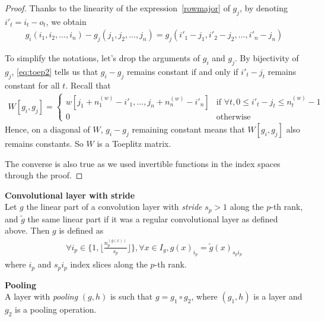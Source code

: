 \begin{proof}
Thanks to the linearity of the expression~\eqref{rowmajor} of $g_j$, by denoting $i'_t = i_t - o_t$, we obtain
\begin{gather}
  g_i(i_1, i_2, \ldots, i_n) - g_j(j_1, j_2, \ldots, j_n) = g_j(i'_1 - j_1, i'_2 - j_2, \ldots, i'_n - j_n)
\label{eq:toep2}
\end{gather}

To simplify the notations, let's drop the arguments of $g_i$ and $g_j$. By bijectivity of $g_j$, \eqref{eq:toep2} tells us that $g_i - g_j$ remains constant if and only if $i'_t - j_t$ remains constant for all $t$. Recall that 
\begin{gather}
  W[g_i,g_j] =
 \begin{cases}
   w[j_1 + n_1^{(w)} - i'_1, \ldots, j_n + n_n^{(w)} - i'_n] & \text{if } \forall t, 0 \le i'_t - j_t \le n_t^{(w)} - 1 \\
   0 & \text{otherwise}
 \end{cases}
\label{eq:toep3}
\end{gather}
Hence, on a diagonal of $W$, $g_i - g_j$ remaining constant means that $W[g_i,g_j]$ also remains constants. So $W$ is a Toeplitz matrix.

The converse is also true as we used invertible functions in the index spaces through the proof.
\end{proof}



\begin{definition}\textbf{Convolutional layer with stride}\\
Let $g$ the linear part of a convolution layer with \emph{stride} $s_p > 1$ along the $p$-th rank, and $\widetilde{g}$ the same linear part if it was a regular convolutional layer as defined above. Then $g$ is defined as
\begin{gather*}
  \forall i_p \in \{ 1, \lfloor \frac{n_p^{(g(x))}}{s_p} \rfloor \}, \forall x \in I_g, g(x)_{i_p} = \widetilde{g}(x)_{s_p i_p}
\end{gather*}
where $i_p$ and $s_p i_p$ index slices along the $p$-th rank.
\end{definition}


\begin{definition}\textbf{Pooling}\\
A layer with \textit{pooling} $(g,h)$ is such that $g = g_1 \circ g_2$, where $(g_1,h)$ is a layer and $g_2$ is a pooling operation.

\end{definition}

